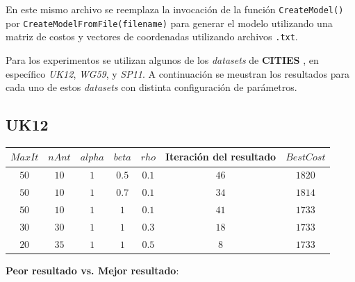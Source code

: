 \documentclass[12pt, a4paper]{article}
\begin{document}
En este mismo archivo se reemplaza la invocación de la función \lstinline{CreateModel()} por \lstinline{CreateModelFromFile(filename)} para generar el modelo utilizando una matriz de costos y vectores de coordenadas utilizando archivos \lstinline{.txt}.

Para los experimentos se utilizan algunos de los \emph{datasets} de \textbf{CITIES} \cite{CITIESCi13:online}, en específico \emph{UK12}, \emph{WG59}, y \emph{SP11}. A continuación se meustran los resultados para cada uno de estos \emph{datasets} con distinta configuración de parámetros.

\subsection{UK12}

\begin{table}[!ht]
    \begin{adjustbox}{width=\textwidth}
        \begin{tabular}{|c|c|c|c|c|c|c|}
            \rowcolor{yellow}
            \hline
            $MaxIt$ & $nAnt$ & $alpha$ & $beta$ & $rho$ & Iteración del resultado & $BestCost$ \\
            \hline
            $50$    & $10$   & $1$     & $0.5$  & $0.1$ & $46$                    & $1820$     \\
            \hline
            $50$    & $10$   & $1$     & $0.7$  & $0.1$ & $34$                    & $1814$     \\
            \hline
            $50$    & $10$   & $1$     & $1$    & $0.1$ & $41$                    & $1733$     \\
            \hline
            $30$    & $30$   & $1$     & $1$    & $0.3$ & $18$                    & $1733$     \\
            \hline
            $20$    & $35$   & $1$     & $1$    & $0.5$ & $8$                     & $1733$     \\
            \hline
        \end{tabular}
    \end{adjustbox}
\end{table}

\textbf{Peor resultado vs. Mejor resultado}:
\end{document}

